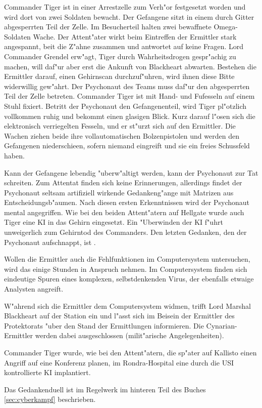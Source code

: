 Commander Tiger ist in einer Arrestzelle zum Verh"or festgesetzt worden und wird dort von zwei Soldaten bewacht. Der Gefangene sitzt in einem durch Gitter abgesperrten Teil der Zelle. Im Besucherteil halten zwei bewaffnete Omega-Soldaten Wache. Der Attent"ater wirkt beim Eintreffen der Ermittler stark angespannt, bei\3t die Z"ahne zusammen und antwortet auf keine Fragen. Lord Commander Grendel erw"agt, Tiger durch Wahrheitsdrogen gespr"achig zu machen, will daf"ur aber erst die Ankunft von Blackheart abwarten. Bestehen die Ermittler darauf, einen Gehirnscan durchzuf"uhren, wird ihnen diese Bitte widerwillig gew"ahrt. Der Psychonaut des Teams muss daf"ur den abgesperrten Teil der Zelle betreten. Commander Tiger ist mit Hand- und Fu\3fesseln auf einem Stuhl fixiert. Betritt der Psychonaut den Gefangenenteil, wird Tiger pl"otzlich vollkommen ruhig und bekommt einen glasigen Blick. Kurz darauf l"osen sich die elektronisch verriegelten Fesseln, und er st"urzt sich auf den Ermittler. Die Wachen ziehen beide ihre vollautomatischen Bolzenpistolen und werden den Gefangenen niederschie\3en, sofern niemand eingreift und sie ein freies Schussfeld haben.

Kann der Gefangene lebendig "uberw"altigt werden, kann der Psychonaut zur Tat schreiten. Zum Attentat finden sich keine Erinnerungen, allerdings findet der Psychonaut seltsam artifiziell wirkende Gedankeng"ange mit Matrizen aus Entscheidungsb"aumen. Nach diesen ersten Erkenntnissen wird der Psychonaut mental angegriffen. Wie bei den beiden Attent"atern auf Hellgate wurde auch Tiger eine KI in das Gehirn eingesetzt. Ein "Uberwinden der KI f"uhrt unweigerlich zum Gehirntod des Commanders. Den letzten Gedanken, den der Psychonaut aufschnappt, ist .

Wollen die Ermittler auch die Fehlfunktionen im Computersystem untersuchen, wird das einige Stunden in Anspruch nehmen. Im Computersystem finden sich eindeutige Spuren eines komplexen, selbstdenkenden Virus, der ebenfalls etwaige Analysten angreift.

W"ahrend sich die Ermittler dem Computersystem widmen, trifft Lord Marshal Blackheart auf der Station ein und l"asst sich im Beisein der Ermittler des Protektorats "uber den Stand der Ermittlungen informieren. Die Cynarian-Ermittler werden dabei ausgeschlossen (milit"arische Angelegenheiten).

\begin{remarks}
	Commander Tiger wurde, wie bei den Attent"atern, die sp"ater auf Kallisto einen Angriff auf eine Konferenz planen, im Rondra-Hospital eine durch die USI kontrollierte KI implantiert.

	Das Gedankenduell ist im Regelwerk im hinteren Teil des Buches \cref{sec:cyberkampf} beschrieben.
\end{remarks}
